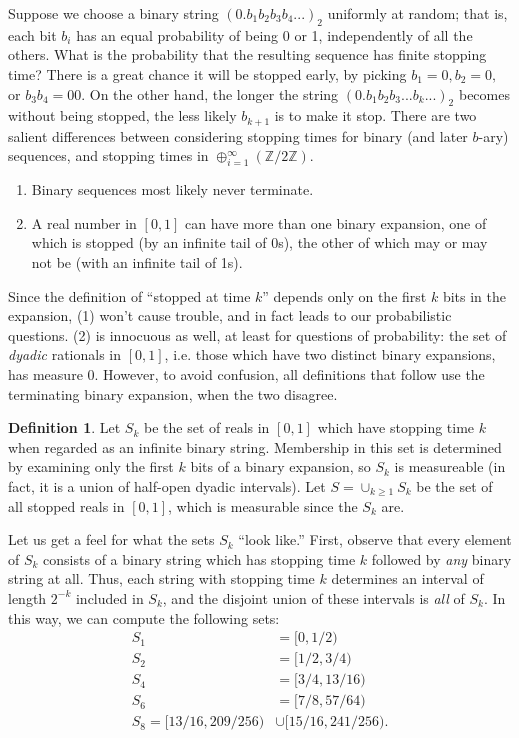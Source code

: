 \documentclass[12pt]{amsart}
\newcommand{\Z}{\mathbb{Z}}
\theoremstyle{definition}
\newtheorem{definition}{Definition}
\begin{document}
Suppose we choose a binary string $(0.b_1 b_2 b_3 b_4 ...)_2$ uniformly at random; that is,
each bit $b_i$ has an equal probability of being 0 or 1, independently of all the others. 
What is the probability that the resulting sequence has finite stopping time? There is a great chance
it will be stopped early, by picking $b_1=0, b_2=0,$ or $b_3 b_4 = 00.$ On the other hand, the longer the string
$(0.b_1 b_2 b_3 ... b_k ...)_2$ becomes without being stopped, 
the less likely $b_{k+1}$ is to make it stop.
There are two salient differences between considering stopping times for binary (and later $b$-ary)
sequences, and stopping times in $\oplus_{i=1}^\infty (\Z/2\Z).$ 
\begin{enumerate}
\item Binary sequences
most likely never terminate. 
\item A real number in $[0,1]$ can have more than one binary expansion,
one of which is stopped (by an infinite tail of 0s), the other of which may or may not be (with an infinite tail of 1s).
\end{enumerate}
Since the definition of ``stopped at time $k$'' depends only on the first $k$ bits in the expansion,
(1) won't cause trouble, and in fact leads to our probabilistic questions.
(2) is innocuous as well, at least for questions of probability: the set of \emph{dyadic} rationals
in $[0,1]$, i.e. those which have two distinct binary expansions, has measure 0.
However, to avoid confusion, all definitions that follow use the terminating binary expansion, when the two disagree.

\begin{definition}
    Let $S_k$ be the set of reals in $[0, 1]$ which have stopping time $k$ when
    regarded as an infinite binary string. Membership in this set is determined
    by examining only the first $k$ bits of a binary expansion, so $S_k$ is
    measureable (in fact, it is a union of half-open dyadic intervals). Let $S = \cup_{k \geq 1} S_k$ be the set of all stopped reals
    in $[0, 1]$, which is measurable since the $S_k$ are.
\end{definition}

Let us get a feel for what the sets $S_k$ ``look like.'' First, observe that
every element of $S_k$ consists of a binary string which has stopping time $k$
followed by \emph{any} binary string at all. Thus, each string with stopping
time $k$ determines an interval of length $2^{-k}$ included in $S_k$, and the
disjoint union of these intervals is \emph{all} of $S_k$. In this way, we can
compute the following sets:
\begin{align*}
    S_1 &= [0, 1/2) \\
    S_2 &= [1/2, 3/4) \\
    S_4 &= [3/4, 13/16) \\
    S_6 &= [7/8, 57/64) \\
    S_8 = [13/16, 209/256) &\cup [15/16, 241/256).
\end{align*}
\end{document}
